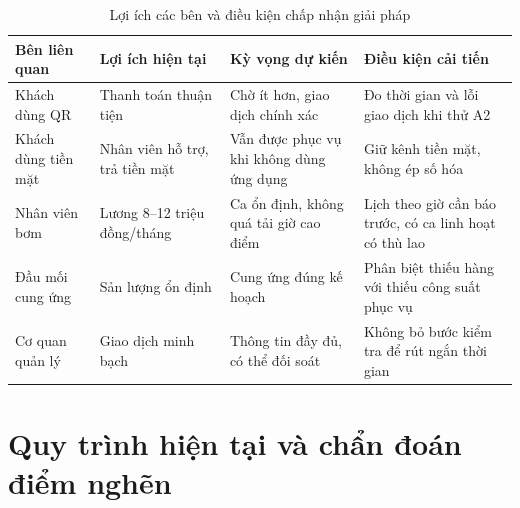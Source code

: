 \begin{table}[htbp]\centering\small
\caption{Lợi ích các bên và điều kiện chấp nhận giải pháp}\label{r1:stakeholders}
\begin{tabularx}{\linewidth}{@{}p{25mm}Y Y Y@{}}
\toprule
Bên liên quan & Lợi ích hiện tại & Kỳ vọng dự kiến & Điều kiện cải tiến \\
\midrule
Khách dùng QR & Thanh toán thuận tiện & Chờ ít hơn, giao dịch chính xác & Đo thời gian và lỗi giao dịch khi thử A2 \\
Khách dùng tiền mặt & Nhân viên hỗ trợ, trả tiền mặt & Vẫn được phục vụ khi không dùng ứng dụng & Giữ kênh tiền mặt, không ép số hóa \\
Nhân viên bơm & Lương 8--12 triệu đồng/tháng~\cite{wage} & Ca ổn định, không quá tải giờ cao điểm & Lịch theo giờ cần báo trước, có ca linh hoạt có thù lao \\
Đầu mối cung ứng & Sản lượng ổn định & Cung ứng đúng kế hoạch & Phân biệt thiếu hàng với thiếu công suất phục vụ \\
Cơ quan quản lý & Giao dịch minh bạch & Thông tin đầy đủ, có thể đối soát & Không bỏ bước kiểm tra để rút ngắn thời gian \\
\bottomrule
\end{tabularx}
\end{table}

\section{Quy trình hiện tại và chẩn đoán điểm nghẽn}
\label{r1:asis}
